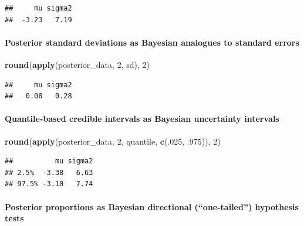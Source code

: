\documentclass[
  11pt,
]{article}
\newenvironment{Shaded}{\begin{snugshade}}{\end{snugshade}}
\newcommand{\DecValTok}[1]{\textcolor[rgb]{0.00,0.00,0.81}{#1}}
\newcommand{\FunctionTok}[1]{\textcolor[rgb]{0.13,0.29,0.53}{\textbf{#1}}}
\newcommand{\NormalTok}[1]{#1}
\begin{document}
\begin{verbatim}
##     mu sigma2 
##  -3.23   7.19
\end{verbatim}

\hypertarget{posterior-standard-deviations-as-bayesian-analogues-to-standard-errors}{%
\paragraph{Posterior standard deviations as Bayesian analogues to standard errors}\label{posterior-standard-deviations-as-bayesian-analogues-to-standard-errors}}

\begin{Shaded}
\begin{Highlighting}[]
\FunctionTok{round}\NormalTok{(}\FunctionTok{apply}\NormalTok{(posterior\_data, }\DecValTok{2}\NormalTok{, sd), }\DecValTok{2}\NormalTok{)}
\end{Highlighting}
\end{Shaded}

\begin{verbatim}
##     mu sigma2 
##   0.08   0.28
\end{verbatim}

\hypertarget{quantile-based-credible-intervals-as-bayesian-uncertainty-intervals}{%
\paragraph{Quantile-based credible intervals as Bayesian uncertainty intervals}\label{quantile-based-credible-intervals-as-bayesian-uncertainty-intervals}}

\begin{Shaded}
\begin{Highlighting}[]
\FunctionTok{round}\NormalTok{(}\FunctionTok{apply}\NormalTok{(posterior\_data, }\DecValTok{2}\NormalTok{, quantile, }\FunctionTok{c}\NormalTok{(.}\DecValTok{025}\NormalTok{, .}\DecValTok{975}\NormalTok{)), }\DecValTok{2}\NormalTok{)}
\end{Highlighting}
\end{Shaded}

\begin{verbatim}
##          mu sigma2
## 2.5%  -3.38   6.63
## 97.5% -3.10   7.74
\end{verbatim}

\hypertarget{posterior-proportions-as-bayesian-directional-one-tailed-hypothesis-tests}{%
\paragraph{Posterior proportions as Bayesian directional (``one-tailed'') hypothesis tests}\label{posterior-proportions-as-bayesian-directional-one-tailed-hypothesis-tests}}
\end{document}
